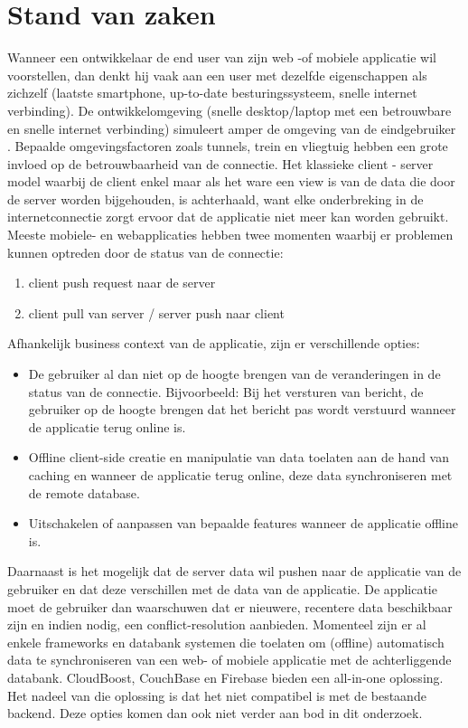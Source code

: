 \section{Stand van zaken}
\label{sec:stand-van-zaken}
Wanneer een ontwikkelaar de end user van zijn web -of mobiele applicatie wil voorstellen, dan denkt hij vaak aan een user met dezelfde eigenschappen als zichzelf (laatste smartphone, up-to-date besturingssysteem,  snelle internet verbinding). De ontwikkelomgeving (snelle desktop/laptop met een betrouwbare en snelle internet verbinding) simuleert amper de omgeving van de eindgebruiker \autocite{chrome-offline-first-statement}. Bepaalde omgevingsfactoren zoals tunnels, trein en vliegtuig hebben een grote invloed op de betrouwbaarheid van de connectie. Het klassieke client - server model waarbij de client enkel maar als het ware een view is van de data die door de server worden bijgehouden, is achterhaald, want elke onderbreking in de internetconnectie zorgt ervoor dat de applicatie niet meer kan worden gebruikt. Meeste mobiele- en webapplicaties hebben twee momenten waarbij er problemen kunnen optreden door de status van de connectie:
\begin{enumerate}  
\item client push request naar de server
\item client pull van server / server push naar client
\end{enumerate}
Afhankelijk business context van de applicatie, zijn er verschillende opties:
\begin{itemize}  
\item De gebruiker al dan niet op de hoogte brengen van de veranderingen in de status van de connectie. Bijvoorbeeld: Bij het versturen van bericht, de gebruiker op de hoogte brengen dat het bericht pas wordt verstuurd wanneer de applicatie terug online is.
\item Offline client-side creatie en manipulatie van data toelaten aan de hand van caching en wanneer de applicatie terug online, deze data synchroniseren met de remote database.
\item Uitschakelen of aanpassen van bepaalde features wanneer de applicatie offline is.
\end{itemize}
Daarnaast is het mogelijk dat de server data wil pushen naar de applicatie van de gebruiker en dat deze verschillen met de data van de applicatie. De applicatie moet de gebruiker dan waarschuwen dat er nieuwere, recentere data beschikbaar zijn en indien nodig, een conflict-resolution aanbieden. Momenteel zijn er al enkele frameworks en databank systemen die toelaten om (offline) automatisch data te synchroniseren van een web- of mobiele applicatie met de achterliggende databank. CloudBoost, CouchBase en Firebase bieden een all-in-one oplossing. Het nadeel van die oplossing is dat het niet compatibel is met de bestaande backend. Deze opties komen dan ook niet verder aan bod in dit  onderzoek.
